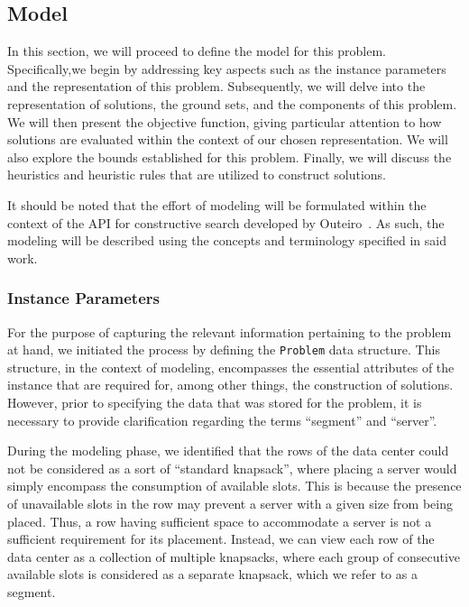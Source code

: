 \subsection{Model}
\label{section:data-center-model}

In this section, we will proceed to define the model for this problem.
Specifically,we begin by addressing key aspects such as the instance
parameters and the representation of this problem. Subsequently, we will delve
into the representation of solutions, the ground sets, and the components of
this problem. We will then present the objective function, giving particular
attention to how solutions are evaluated within the context of our chosen
representation. We will also explore the bounds established for this problem.
Finally, we will discuss the heuristics and heuristic rules that are utilized to
construct solutions.

It should be noted that the effort of modeling will be formulated within the
context of the API for constructive search developed by
Outeiro~\cite{outeiro2021application}. As such, the modeling will be described
using the concepts and terminology specified in said work.

\subsubsection{Instance Parameters}
\label{section:data-center-representation}

For the purpose of capturing the relevant information pertaining to the problem
at hand, we initiated the process by defining the \texttt{Problem} data
structure. This structure, in the context of modeling, encompasses the essential
attributes of the instance that are required for, among other things, the
construction of solutions. However, prior to specifying the data that was stored
for the problem, it is necessary to provide clarification regarding the terms
``segment'' and ``server''.

During the modeling phase, we identified that the rows of the data center could
not be considered as a sort of ``standard knapsack'', where placing a server
would simply encompass the consumption of available slots. This is because the
presence of unavailable slots in the row may prevent a server with a given size
from being placed. Thus, a row having sufficient space to accommodate a
server is not a sufficient requirement for its placement. Instead, we can view
each row of the data center as a collection of multiple knapsacks, where each
group of consecutive available slots is considered as a separate knapsack, which
we refer to as a segment.


